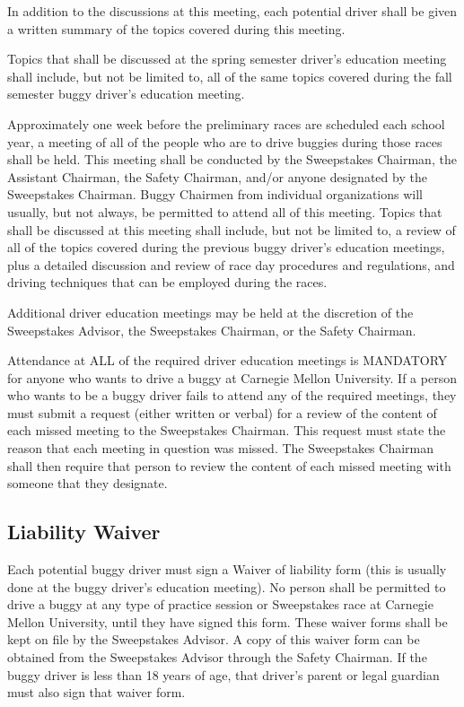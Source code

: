 	In addition to the discussions at this meeting, each potential driver shall be given a written summary of the topics covered during this meeting. 
	
	Topics that shall be discussed at the spring semester driver's education meeting shall include, but not be limited to, all of the same topics covered during the fall semester buggy driver's education meeting.
	
	Approximately one week before the preliminary races are scheduled each school year, a meeting of all of the people who are to drive buggies during those races shall be held. This meeting shall be conducted by the Sweepstakes Chairman, the Assistant Chairman, the Safety Chairman, and/or anyone designated by the Sweepstakes Chairman. Buggy Chairmen from individual organizations will usually, but not always, be	permitted to attend all of this meeting. Topics that shall be discussed at this meeting shall include, but not be limited to, a review of all of the topics covered during the previous buggy driver's education meetings, plus a detailed discussion and review of race day procedures and regulations, and driving techniques that can be employed during the races.
	
	Additional driver education meetings may be held at the discretion of the Sweepstakes Advisor, the Sweepstakes Chairman, or the Safety Chairman.
	
	Attendance at ALL of the required driver education meetings is MANDATORY for anyone who wants to drive a buggy at Carnegie Mellon University. If a person who wants to be a buggy driver fails to attend any of the required meetings, they must submit a request (either written or verbal) for a review of the content of each missed meeting to the Sweepstakes Chairman. This request must state the reason that each meeting in question was missed. The Sweepstakes Chairman shall then require that person to review the content of each missed meeting with someone that they designate.

\subsection{Liability Waiver}

	Each potential buggy driver must sign a Waiver of liability form (this is usually done at the buggy driver's education meeting). No person shall be permitted to drive a buggy at any type of practice session or Sweepstakes race at Carnegie Mellon University, until they have signed this form. These waiver forms shall be kept on file by the Sweepstakes Advisor. A copy of this waiver form can be obtained from the Sweepstakes Advisor through the Safety Chairman. If the buggy driver is less than 18 years of age, that driver's parent or legal guardian must also sign that waiver form.


